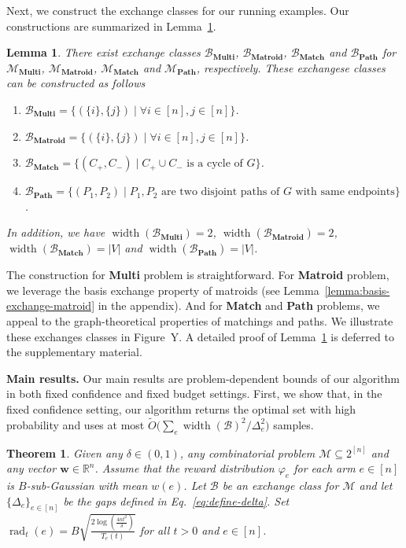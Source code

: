 \documentclass{article}
\newtheorem{lemma}{Lemma}
\newtheorem{theorem}{Theorem}
\newcommand{\Rew}{\varphi}
\newcommand{\M}{\mathcal M}
\newcommand{\B}{\mathcal B}
\newcommand{\RR}{\mathbb R}
\DeclareMathOperator{\rank}{width}
\DeclareMathOperator{\rad}{rad}
\newcommand{\MultiIdent}{\textbf{Multi}\xspace}
\newcommand{\Matroid}{\textbf{Matroid}\xspace}
\newcommand{\Match}{\textbf{Match}\xspace}
\newcommand{\Path}{\textbf{Path}\xspace}
\renewcommand{\vec}[1]{\boldsymbol{#1}}
\begin{document}
\begin{spacing}{1.1}
Next, we construct the exchange classes for our running examples. 
Our constructions are summarized in Lemma~\ref{lemma:example-exchange-class}.
\begin{lemma}
There exist exchange classes $\B_{\MultiIdent}$, $\B_{\Matroid}$, $\B_{\Match}$ and $\B_{\Path}$ for $\M_{\MultiIdent}$, $\M_{\Matroid}$, $\M_{\Match}$ and $\M_{\Path}$, respectively. 
These exchangese classes can be constructed as follows
\begin{enumerate}
	\item $\B_{\MultiIdent}=\big\{(\{i\},\{j\})\;|\;\forall i\in [n], j\in [n]\big\}$.
	\item $\B_{\Matroid}=\big\{(\{i\},\{j\})\;|\;\forall i\in [n], j\in [n]\big\}$.
	\item $\B_{\Match}=\big\{(C_+,C_-)\;|\; C_+\cup C_- \text{ is a cycle of }G\big\}$.
	\item $\B_{\Path}=\big\{ (P_1, P_2) \;|\;P_1,P_2\text{ are two disjoint paths of }G\text{ with same endpoints}\big\}$.
\end{enumerate}
In addition, we have $\rank(\B_{\MultiIdent})=2$, $\rank(\B_{\Matroid})=2$, $\rank(\B_{\Match})=|V|$ and $\rank(\B_{\Path})=|V|$.
\label{lemma:example-exchange-class}
\end{lemma}
The  construction for \MultiIdent problem is straightforward. 
For \Matroid problem, we leverage the basis exchange property of matroids (see Lemma~\ref{lemma:basis-exchange-matroid} in the appendix).
And for \Match and \Path problems, we appeal to the graph-theoretical properties of matchings and paths.
We illustrate these  exchanges classes in Figure~Y.
A detailed proof of Lemma~\ref{lemma:example-exchange-class} is deferred to the supplementary material.


\textbf{Main results.} 
Our main results are problem-dependent bounds of our algorithm in both fixed confidence and fixed budget settings.
First, we show that, in the fixed confidence setting, our algorithm returns the optimal set with high probability and uses at most $\tilde O\big(\sum_e \rank(\B)^2/\Delta_e^2\big)$ samples.
\begin{theorem}
Given any $\delta \in (0,1)$, any combinatorial problem $\M \subseteq 2^{[n]}$ and any vector $\vec w \in \RR^{n}$.
Assume that the reward distribution $\Rew_e$ for each arm $e\in [n]$ is  $B$-sub-Gaussian with mean $w(e)$.
Let $\B$ be an exchange class for $\M$ and let $\{\Delta_e\}_{e\in [n]}$ be the gaps defined in Eq.~\eqref{eq:define-delta}.
Set $\rad_t(e) = B\sqrt{\frac{2\log\left(\frac{4n t^2}\delta\right)}{T_e(t)}}$ for all $t > 0$ and $e\in[n]$.


\end{theorem}
\end{spacing}
\end{document}
